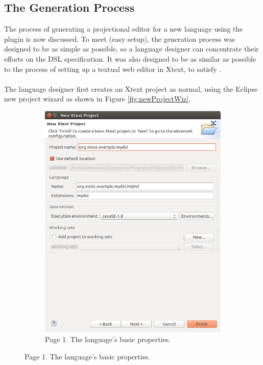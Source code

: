 \documentclass{article}
\begin{document}
\subsection{The Generation Process}
The process of generating a projectional editor for a new language using the plugin is now discussed. To meet \RSetup (easy setup), the generation process was designed to be as simple as possible, so a language designer can concentrate their efforts on the DSL specification. It was also designed to be as similar as possible to the process of setting up a textual web editor in Xtext, to satisfy \RFamiliarity.
\\
\\
The language designer first creates an Xtext project as normal, using the Eclipse new project wizard as shown in Figure \ref{fig:newProjectWiz},
\begin{figure}[t!]
  \centering
  \begin{subfigure}[b]{0.45\linewidth}
    \includegraphics[width=\linewidth]{./Screenshots/newXtextProject.png}
    \caption{Page 1. The language's basic properties.}

\end{subfigure}
\end{figure}
\end{document}

